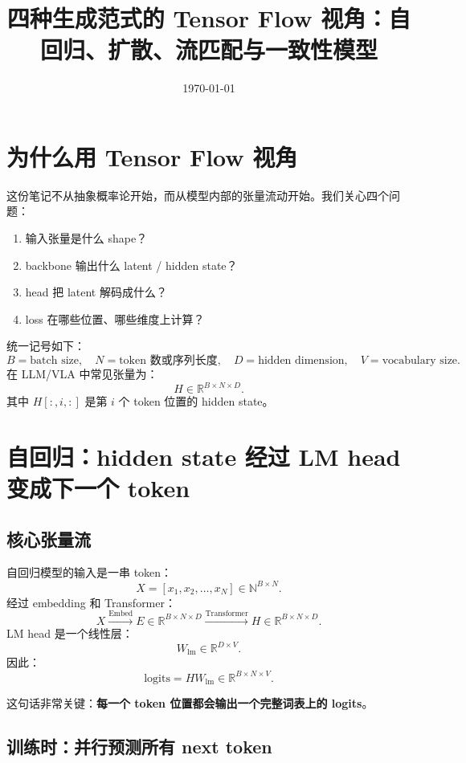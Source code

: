 \documentclass[11pt,a4paper]{ctexart}
\title{四种生成范式的 Tensor Flow 视角：自回归、扩散、流匹配与一致性模型}
\author{}
\date{\today}
\begin{document}
\maketitle
\tableofcontents
\newpage

\section{为什么用 Tensor Flow 视角}

这份笔记不从抽象概率论开始，而从模型内部的张量流动开始。我们关心四个问题：
\begin{enumerate}
  \item 输入张量是什么 shape？
  \item backbone 输出什么 latent / hidden state？
  \item head 把 latent 解码成什么？
  \item loss 在哪些位置、哪些维度上计算？
\end{enumerate}

统一记号如下：
\[
  B=\text{batch size},\quad
  N=\text{token 数或序列长度},\quad
  D=\text{hidden dimension},\quad
  V=\text{vocabulary size}.
\]
在 LLM/VLA 中常见张量为：
\[
  H\in\mathbb{R}^{B\times N\times D}.
\]
其中 \(H[:,i,:]\) 是第 \(i\) 个 token 位置的 hidden state。

\section{自回归：hidden state 经过 LM head 变成下一个 token}

\subsection{核心张量流}

自回归模型的输入是一串 token：
\[
  X=[x_1,x_2,\ldots,x_N]\in\mathbb{N}^{B\times N}.
\]
经过 embedding 和 Transformer：
\[
  X
  \xrightarrow{\mathrm{Embed}}
  E\in\mathbb{R}^{B\times N\times D}
  \xrightarrow{\mathrm{Transformer}}
  H\in\mathbb{R}^{B\times N\times D}.
\]
LM head 是一个线性层：
\[
  W_{\mathrm{lm}}\in\mathbb{R}^{D\times V}.
\]
因此：
\[
  \mathrm{logits}=H W_{\mathrm{lm}}
  \in\mathbb{R}^{B\times N\times V}.
\]

这句话非常关键：\textbf{每一个 token 位置都会输出一个完整词表上的 logits}。

\subsection{训练时：并行预测所有 next token}
\end{document}
